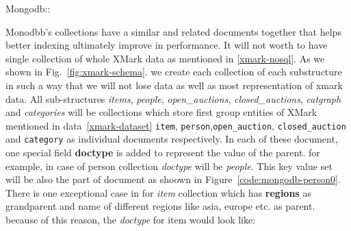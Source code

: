 Mongodb::

Monodbb's collections have a similar and related documents together that helps better indexing ultimately improve in performance. It will not worth to have single collection of whole XMark data as mentioned in \ref{xmark-nosql}. As we shown in Fig.~\ref{fig:xmark-schema}. we create each collection of each substructure in such a way that we will not lose data as well as most representation of xmark data. All sub-structures \textit{items}, \textit{people}, \textit{open\_auctions}, \textit{closed\_auctions}, \textit{catgraph} and \textit{categories} will be collections which store first group entities of XMark mentioned in data~\ref{xmark-dataset} \texttt{item}, \texttt{person},\texttt{open\_auction}, \texttt{closed\_auction} and \texttt{category} as individual documents respectively. In each of these document, one special field \textbf{doctype} is added to represent the value of the parent. for example, in case of person collection \textit{doctype} will be \textit{people}. This key value set will be also the part of document as shoown in Figure~\ref{code:mongodb-person0}. There is one exceptional case in for \textit{item} collection which has \textbf{regions} as grandparent and name of different regions like asia, europe etc. as parent. because of this reason, the \textit{doctype} for item would look like:
\label{code:xmark-mongo-doctype}